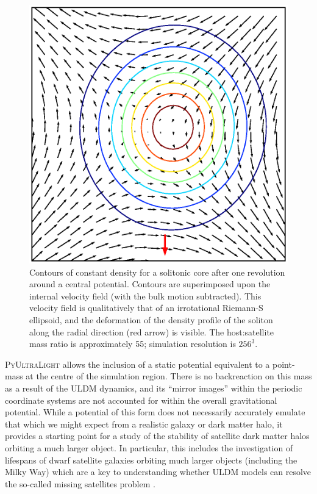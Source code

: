 \documentclass[a4paper,11pt]{article}
\newcommand{\PyUltraLight}{\textsc{PyUltraLight}\xspace}
\begin{document}
\begin{figure}
  \includegraphics[width=1.\textwidth,trim=1cm 1cm 0 1cm,clip]{riemann}
  \caption{Contours of constant density for a solitonic core after one revolution around a central potential. Contours are superimposed upon the internal velocity field (with the bulk motion subtracted). This velocity field is qualitatively that of an irrotational Riemann-S ellipsoid, and the deformation of the density profile of the soliton along the radial direction (red arrow) is visible. The host:satellite mass ratio is approximately 55; simulation resolution is $256^3$.}
  \label{fig:riemann}
\end{figure}

\PyUltraLight allows the inclusion of a static potential equivalent to a point-mass  at the centre of the simulation region.  There is no backreaction on this mass as a result of the ULDM dynamics, and its ``mirror images'' within the periodic coordinate systems are not accounted for within the overall gravitational potential. While a potential of this form does not necessarily accurately emulate that which we might expect from a realistic galaxy or dark matter halo, it provides a starting point for a study of the stability of satellite dark matter halos orbiting a much larger object. In particular, this includes the investigation of lifespans of dwarf satellite galaxies orbiting much larger objects (including the Milky Way) which are a key to understanding whether ULDM models can resolve the so-called missing satellites problem \cite{Weinberg:2013aya}.
\end{document}
